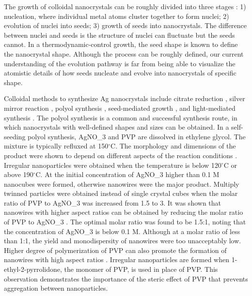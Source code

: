 The growth of colloidal nanocrystals can be roughly divided into three stages \cite{Xia_2008}:
1) nucleation, where individual metal atoms cluster together to form nuclei;
2) evolution of nuclei into seeds;
3) growth of seeds into nanocrystals.
The difference between nuclei and seeds is the structure of nuclei can fluctuate but the seeds cannot.
In a thermodynamic-control growth, the seed shape is known to define the nanocrystal shape.
Although the process can be roughly defined, our current understanding of the evolution pathway is far from being able to visualize the atomistic details of how seeds nucleate and evolve into nanocrystals of specific shape.

Colloidal methods to synthesize Ag nanocrystals include citrate reduction \cite{Wu_2008,Lee_1982}, silver mirror reaction \cite{Yin_2002}, polyol synthesis \cite{Wiley_2008,Sun_2002}, seed-mediated growth \cite{Pietrobon_2009,Sun_2002,Zhang_2010}, and light-mediated synthesis \cite{Pietrobon_2008,Jin_2003,Zhou_2008}.
The polyol synthesis is a common and successful synthesis route, in which nanocrystals with well-defined shapes and sizes can be obtained.
In a self-seeding polyol synthesis, AgNO_3 and PVP are dissolved in ethylene glycol.
The mixture is typically refluxed at 150$^{\circ}$C.
The morphology and dimensions of the product were shown to depend on different aspects of the reaction conditions \cite{Sun_2002}.
Irregular nanoparticles were obtained when the temperature is below 120$^{\circ}$C or above 190$^{\circ}$C.
At the initial concentration of AgNO_3 higher than 0.1 M nanocubes were formed, otherwise nanowires were the major product.
Multiply twinned particles were obtained instead of single crystal cubes when the molar ratio of PVP to AgNO_3 was increased from 1.5 to 3.
It was shown that nanowires with higher aspect ratios can be obtained by reducing the molar ratio of PVP to AgNO_3 \cite{Sun_2002}.
The optimal molar ratio was found to be 1.5:1, noting that the concentration of AgNO_3 is below 0.1 M.
Although at a molar ratio of less than 1:1, the yield and monodispersity of nanowires were too unacceptably low.
Higher degree of polymerization of PVP can also promote the formation of nanowires with high aspect ratios \cite{Sun_2002}.
Irregular nanoparticles are formed when 1-ethyl-2-pyrrolidone, the monomer of PVP, is used in place of PVP.
This observation demonstrates the importance of the steric effect of PVP that prevents aggregation between nanoparticles.

